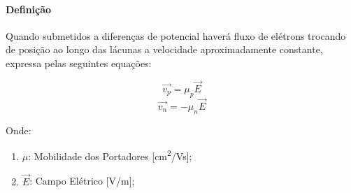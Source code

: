 \documentclass{article}
\begin{document}
            \paragraph{Definição}Quando submetidos a diferenças de potencial haverá fluxo de elétrons trocando de posição ao longo das lácunas a velocidade aproximadamente constante, expressa pelas seguintes equações:
                \begin{multicols}{2}
                    \begin{equation}
                        \boxed{
                            \vec{v_{p}} = \mu_{p} \vec{E}
                        }\label{eq:1}
                    \end{equation}
                    \begin{equation}
                        \boxed{
                            \vec{v_{n}} = - \mu_{n} \vec{E}
                        }\label{eq:2}
                    \end{equation}
                \end{multicols}\noindent
            Onde:
                \begin{enumerate}[noitemsep]
                    \item $\mu$: Mobilidade dos Portadores [cm\textsuperscript{2}/Vs];
                    \item $\vec{E}$: Campo Elétrico [V/m];
                \end{enumerate}
\end{document}
